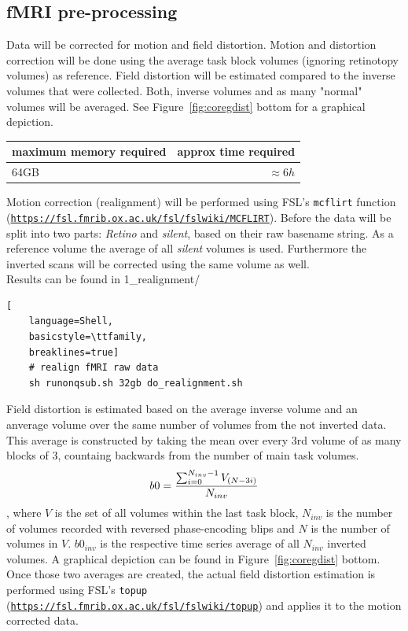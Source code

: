 \documentclass[12pt,a4paper]{scrartcl}
\begin{document}
\subsection{fMRI pre-processing}
Data will be corrected for motion and field distortion. Motion and distortion correction will be done using the average task block volumes (ignoring retinotopy volumes) as reference. Field distortion will be estimated compared to the inverse volumes that were collected. Both, inverse volumes and as many "normal" volumes will be averaged. See Figure~\ref{fig:coregdist} bottom for a graphical depiction.
\begin{table}[h]
\begin{tabular}{l | r}
\toprule
maximum memory required & approx time required\\\toprule
64GB & $\approx 6h$ \\\bottomrule
\end{tabular}
\end{table}
\FloatBarrier
\noindent Motion correction (realignment) will be performed using FSL's \texttt{mcflirt} function (\href{https://fsl.fmrib.ox.ac.uk/fsl/fslwiki/MCFLIRT}{\nolinkurl{https://fsl.fmrib.ox.ac.uk/fsl/fslwiki/MCFLIRT}}). Before the data will be split into two parts: \textit{Retino} and  \textit{silent}, based on their raw basename string. As a reference volume the average of all \textit{silent} volumes is used. Furthermore the inverted scans will be corrected using the same volume as well.\\

\noindent Results can be found in 1\_realignment/\\
\begin{lstlisting}[
    language=Shell,
    basicstyle=\ttfamily,
    breaklines=true]
    # realign fMRI raw data
    sh runonqsub.sh 32gb do_realignment.sh
\end{lstlisting}
Field distortion is estimated based on the average inverse volume and an anverage volume over the same number of volumes from the not inverted data. This average is constructed by taking the mean over every 3rd volume of as many blocks of 3, countaing backwards from the number of main task volumes.
\begin{equation}
\centering
b0=\frac{\sum_{i=0}^{N_{inv}-1}V_{(N-3i)}}{N_{inv}}
\end{equation}
\noindent, where $V$ is the set of all volumes within the last task block, $N_{inv}$ is the number of volumes recorded with reversed phase-encoding blips and $N$ is the number of volumes in $V$. $b0_{inv}$ is the respective time series average of all $N_{inv}$ inverted volumes. A graphical depiction can be found in Figure~\ref{fig:coregdist} bottom. Once those two averages are created, the actual field distortion estimation is performed using FSL's \texttt{topup} (\href{https://fsl.fmrib.ox.ac.uk/fsl/fslwiki/topup}{\nolinkurl{https://fsl.fmrib.ox.ac.uk/fsl/fslwiki/topup}}) and applies it to the motion corrected data.\\
\end{document}

